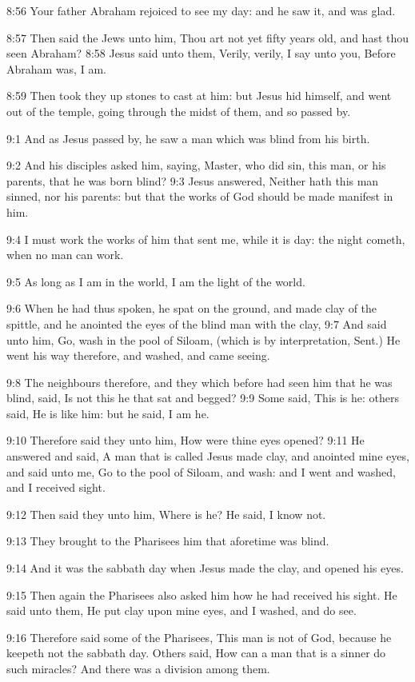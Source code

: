 8:56 Your father Abraham rejoiced to see my day: and he saw it, and was glad.

8:57 Then said the Jews unto him, Thou art not yet fifty years old, and hast thou seen Abraham?  8:58 Jesus said unto them, Verily, verily, I say unto you, Before Abraham was, I am.

8:59 Then took they up stones to cast at him: but Jesus hid himself, and went out of the temple, going through the midst of them, and so passed by.

9:1 And as Jesus passed by, he saw a man which was blind from his birth.

9:2 And his disciples asked him, saying, Master, who did sin, this man, or his parents, that he was born blind?  9:3 Jesus answered, Neither hath this man sinned, nor his parents: but that the works of God should be made manifest in him.

9:4 I must work the works of him that sent me, while it is day: the night cometh, when no man can work.

9:5 As long as I am in the world, I am the light of the world.

9:6 When he had thus spoken, he spat on the ground, and made clay of the spittle, and he anointed the eyes of the blind man with the clay, 9:7 And said unto him, Go, wash in the pool of Siloam, (which is by interpretation, Sent.) He went his way therefore, and washed, and came seeing.

9:8 The neighbours therefore, and they which before had seen him that he was blind, said, Is not this he that sat and begged?  9:9 Some said, This is he: others said, He is like him: but he said, I am he.

9:10 Therefore said they unto him, How were thine eyes opened?  9:11 He answered and said, A man that is called Jesus made clay, and anointed mine eyes, and said unto me, Go to the pool of Siloam, and wash: and I went and washed, and I received sight.

9:12 Then said they unto him, Where is he? He said, I know not.

9:13 They brought to the Pharisees him that aforetime was blind.

9:14 And it was the sabbath day when Jesus made the clay, and opened his eyes.

9:15 Then again the Pharisees also asked him how he had received his sight. He said unto them, He put clay upon mine eyes, and I washed, and do see.

9:16 Therefore said some of the Pharisees, This man is not of God, because he keepeth not the sabbath day. Others said, How can a man that is a sinner do such miracles? And there was a division among them.

